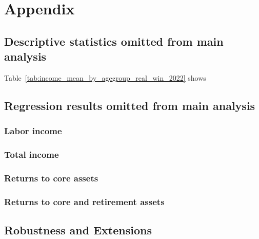 \section*{Appendix}

\subsection{Descriptive statistics omitted from main analysis}


\label{tab:income_mean_by_year_real_win}

\par

Table~\ref{tab:income_mean_by_agegroup_real_win_2022} shows

\label{tab:income_mean_by_agegroup_real_win_2022}


\subsection{Regression results omitted from main analysis}

\par %

\subsubsection{Labor income}

\subsubsection{Total income}

\subsubsection{Returns to core assets}

\subsubsection{Returns to core and retirement assets}

\subsection{Robustness and Extensions}

\par %

